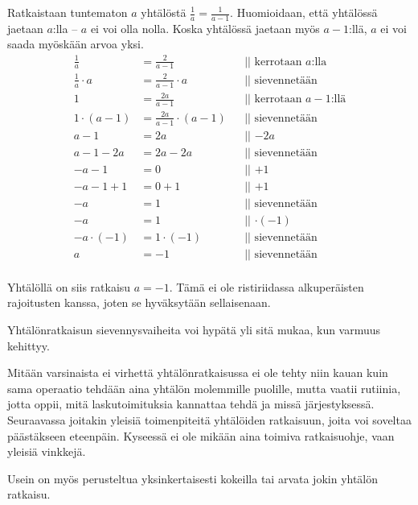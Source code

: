 \begin{esimerkki}
Ratkaistaan tuntematon $a$ yhtälöstä $\frac{1}{a}=\frac{1}{a-1}$. Huomioidaan, että yhtälössä jaetaan $a$:lla -- $a$ ei voi olla nolla. Koska yhtälössä jaetaan myös $a-1$:llä, $a$ ei voi saada myöskään arvoa yksi.
		\begin{align*}
			\frac{1}{a}&=\frac{2}{a-1} && \text{|| kerrotaan $a$:lla}\\
			\frac{1}{a}\cdot a&=\frac{2}{a-1}\cdot a && \text{|| sievennetään}\\	
			1&=\frac{2a}{a-1} && \text{|| kerrotaan $a-1$:llä}\\
			1\cdot (a-1)&=\frac{2a}{a-1}\cdot (a-1) && \text{|| sievennetään}\\
			a-1&=2a && \text{|| $-2a$}\\
			a-1-2a&=2a-2a && \text{|| sievennetään}\\
			-a-1&=0 && \text{|| $+1$}\\
			-a-1+1&=0+1 && \text{|| $+1$}\\
			-a&=1 && \text{||  sievennetään}\\
			-a&=1 && \text{||  $\cdot (-1)$}\\
			-a\cdot (-1)&=1\cdot(-1) && \text{|| sievennetään}\\
			a&=-1 && \text{|| sievennetään}\\
\end{align*}

Yhtälöllä on siis ratkaisu $a=-1$. Tämä ei ole ristiriidassa alkuperäisten rajoitusten kanssa, joten se hyväksytään sellaisenaan.
\end{esimerkki}

Yhtälönratkaisun sievennysvaiheita voi hypätä yli sitä mukaa, kun varmuus kehittyy.

Mitään varsinaista ei virhettä yhtälönratkaisussa ei ole tehty niin kauan kuin sama operaatio tehdään aina yhtälön molemmille puolille, mutta vaatii rutiinia, jotta oppii, mitä laskutoimituksia kannattaa tehdä ja missä järjestyksessä. Seuraavassa joitakin yleisiä toimenpiteitä yhtälöiden ratkaisuun, joita voi soveltaa päästäkseen eteenpäin. Kyseessä ei ole mikään aina toimiva ratkaisuohje, vaan yleisiä vinkkejä.


Usein on myös perusteltua yksinkertaisesti kokeilla tai arvata jokin yhtälön ratkaisu.